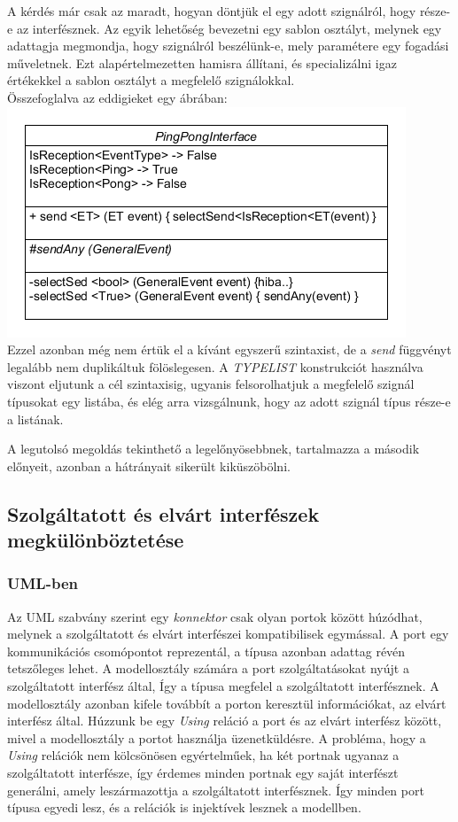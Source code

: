 \documentclass[a4paper,12pt]{report}
\begin{document}
\begin{enumerate}
A kérdés már csak az maradt, hogyan döntjük el egy adott szignálról, hogy része-e az interfésznek. Az egyik lehetőség bevezetni egy sablon osztályt, melynek egy adattagja megmondja, hogy szignálról beszélünk-e, mely paramétere egy fogadási műveletnek. Ezt alapértelmezetten hamisra állítani, és specializálni igaz értékekkel a sablon osztályt a megfelelő szignálokkal. \\
Összefoglalva az eddigieket egy ábrában: \\
\includegraphics[scale=0.8]{better_inf.png} \\
Ezzel azonban még nem értük el a kívánt egyszerű szintaxist, de a \textit{send} függvényt legalább nem duplikáltuk fölöslegesen. A \textit{TYPELIST} \cite{typelist} konstrukciót használva viszont eljutunk a cél szintaxisig, ugyanis felsorolhatjuk a megfelelő szignál típusokat egy listába, és elég arra vizsgálnunk, hogy az adott szignál típus része-e a listának.
\end{enumerate}

A legutolsó megoldás tekinthető a legelőnyösebbnek, tartalmazza a második előnyeit, azonban a hátrányait sikerült kiküszöbölni.

\subsection{Szolgáltatott és elvárt interfészek megkülönböztetése}
\subsubsection{UML-ben}
Az UML szabvány szerint egy \textit{konnektor} csak olyan portok között
húzódhat, melynek a szolgáltatott és elvárt interfészei kompatibilisek egymással.
A port egy kommunikációs csomópontot reprezentál, a típusa azonban adattag révén tetszőleges lehet.
A modellosztály számára a port szolgáltatásokat nyújt a szolgáltatott interfész által, Így a típusa megfelel a szolgáltatott interfésznek.
A modellosztály azonban kifele továbbít a porton keresztül információkat, az elvárt interfész által.
Húzzunk be egy \textit{Using} reláció a port és az elvárt interfész között, mivel a modellosztály a portot használja üzenetküldésre.
A probléma, hogy a \textit{Using} relációk nem kölcsönösen egyértelműek, ha két portnak ugyanaz a szolgáltatott interfésze, így
érdemes minden portnak egy saját interfészt generálni, amely leszármazottja a szolgáltatott interfésznek. Így minden port típusa egyedi lesz, és a relációk is injektívek lesznek a modellben.
\end{document}
